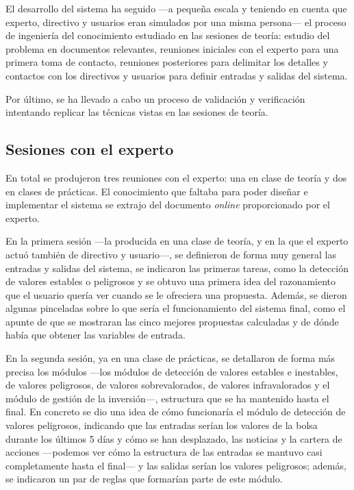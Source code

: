 \documentclass[a4paper, 11pt, titlepage]{article}
\begin{document}
    El desarrollo del sistema ha seguido ---a pequeña escala y teniendo en cuenta que experto, directivo y usuarios eran simulados por una misma persona--- el proceso de ingeniería del conocimiento estudiado en las sesiones de teoría: estudio del problema en documentos relevantes, reuniones iniciales con el experto para una primera toma de contacto, reuniones posteriores para delimitar los detalles y contactos con los directivos y usuarios para definir entradas y salidas del sistema.

    Por último, se ha llevado a cabo un proceso de validación y verificación intentando replicar las técnicas vistas en las sesiones de teoría.

    \subsection{Sesiones con el experto}

    En total se produjeron tres reuniones con el experto: una en clase de teoría y dos en clases de prácticas. El conocimiento que faltaba para poder diseñar e implementar el sistema se extrajo del documento \emph{online} proporcionado por el experto.

    En la primera sesión ---la producida en una clase de teoría, y en la que el experto actuó también de directivo y usuario---, se definieron de forma muy general las entradas y salidas del sistema, se indicaron las primeras tareas, como la detección de valores estables o peligrosos y se obtuvo una primera idea del razonamiento que el usuario quería ver cuando se le ofreciera una propuesta. Además, se dieron algunas pinceladas sobre lo que sería el funcionamiento del sistema final, como el apunte de que se mostraran las cinco mejores propuestas calculadas y de dónde había que obtener las variables de entrada.

    En la segunda sesión, ya en una clase de prácticas, se detallaron de forma más precisa los módulos ---los módulos de detección de valores estables e inestables, de valores peligrosos, de valores sobrevalorados, de valores infravalorados y el módulo de gestión de la inversión---, estructura que se ha mantenido hasta el final. En concreto se dio una idea de cómo funcionaría el módulo de detección de valores peligrosos, indicando que las entradas serían los valores de la bolsa durante los últimos 5 días y cómo se han desplazado, las noticias y la cartera de acciones ---podemos ver cómo la estructura de las entradas se mantuvo casi completamente hasta el final--- y las salidas serían los valores peligrosos; además, se indicaron un par de reglas que formarían parte de este módulo.
\end{document}
